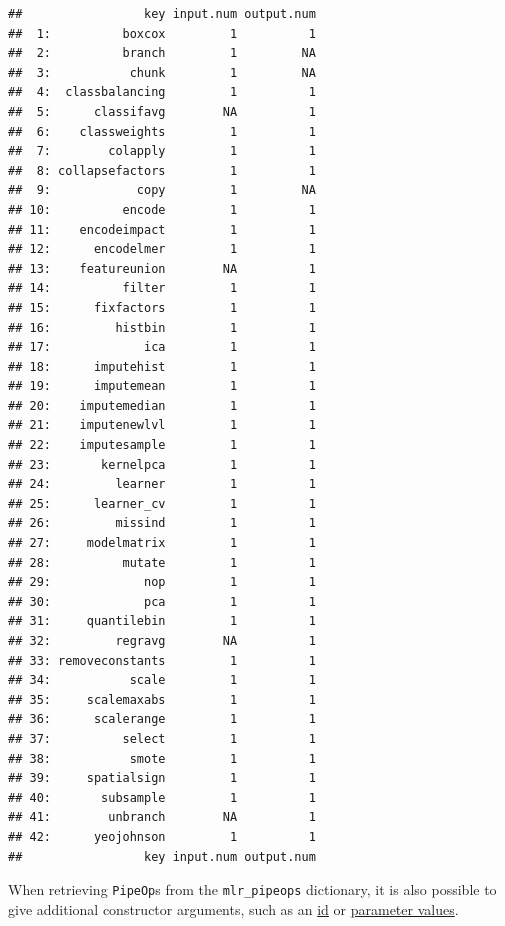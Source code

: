 \documentclass[]{scrbook}
\newenvironment{Shaded}{\begin{snugshade}}{\end{snugshade}}
\newcommand{\DataTypeTok}[1]{\textcolor[rgb]{0.13,0.29,0.53}{#1}}
\newcommand{\DecValTok}[1]{\textcolor[rgb]{0.00,0.00,0.81}{#1}}
\newcommand{\KeywordTok}[1]{\textcolor[rgb]{0.13,0.29,0.53}{\textbf{#1}}}
\newcommand{\NormalTok}[1]{#1}
\newcommand{\OperatorTok}[1]{\textcolor[rgb]{0.81,0.36,0.00}{\textbf{#1}}}
\newcommand{\StringTok}[1]{\textcolor[rgb]{0.31,0.60,0.02}{#1}}
\renewenvironment{Shaded} {\begin{snugshade}\small} {\end{snugshade}}
\begin{document}
\begin{verbatim}
##                 key input.num output.num
##  1:          boxcox         1          1
##  2:          branch         1         NA
##  3:           chunk         1         NA
##  4:  classbalancing         1          1
##  5:      classifavg        NA          1
##  6:    classweights         1          1
##  7:        colapply         1          1
##  8: collapsefactors         1          1
##  9:            copy         1         NA
## 10:          encode         1          1
## 11:    encodeimpact         1          1
## 12:      encodelmer         1          1
## 13:    featureunion        NA          1
## 14:          filter         1          1
## 15:      fixfactors         1          1
## 16:         histbin         1          1
## 17:             ica         1          1
## 18:      imputehist         1          1
## 19:      imputemean         1          1
## 20:    imputemedian         1          1
## 21:    imputenewlvl         1          1
## 22:    imputesample         1          1
## 23:       kernelpca         1          1
## 24:         learner         1          1
## 25:      learner_cv         1          1
## 26:         missind         1          1
## 27:     modelmatrix         1          1
## 28:          mutate         1          1
## 29:             nop         1          1
## 30:             pca         1          1
## 31:     quantilebin         1          1
## 32:         regravg        NA          1
## 33: removeconstants         1          1
## 34:           scale         1          1
## 35:     scalemaxabs         1          1
## 36:      scalerange         1          1
## 37:          select         1          1
## 38:           smote         1          1
## 39:     spatialsign         1          1
## 40:       subsample         1          1
## 41:        unbranch        NA          1
## 42:      yeojohnson         1          1
##                 key input.num output.num
\end{verbatim}

When retrieving \texttt{PipeOp}s from the \texttt{mlr\_pipeops} dictionary, it is also possible to give additional constructor arguments, such as an \protect\hyperlink{pipeop-ids-and-id-name-clashes}{id} or \protect\hyperlink{hyperparameters}{parameter values}.

\begin{Shaded}
\end{Shaded}
\end{document}
